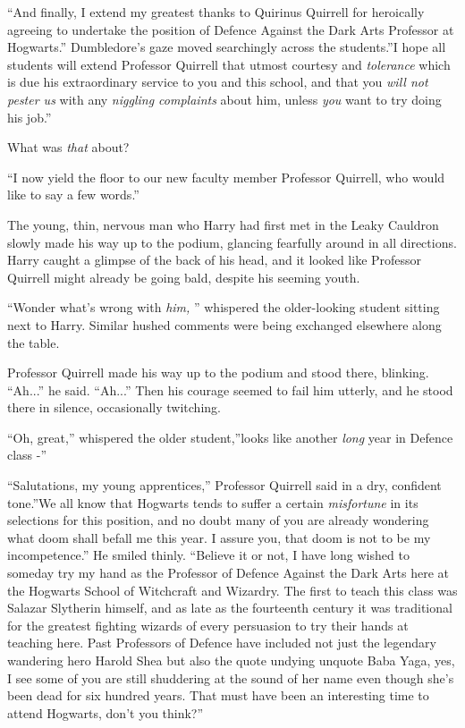 ``And finally, I extend my greatest thanks to Quirinus Quirrell for
heroically agreeing to undertake the position of Defence Against the
Dark Arts Professor at Hogwarts.'' Dumbledore's gaze moved searchingly
across the students.''I hope all students will extend Professor Quirrell
that utmost courtesy and \emph{tolerance} which is due his extraordinary
service to you and this school, and that you \emph{will not pester us}
with any \emph{niggling complaints} about him, unless \emph{you} want to
try doing his job.''

What was \emph{that} about?

``I now yield the floor to our new faculty member Professor Quirrell,
who would like to say a few words.''

The young, thin, nervous man who Harry had first met in the Leaky
Cauldron slowly made his way up to the podium, glancing fearfully around
in all directions. Harry caught a glimpse of the back of his head, and
it looked like Professor Quirrell might already be going bald, despite
his seeming youth.

``Wonder what's wrong with \emph{him,} '' whispered the older-looking
student sitting next to Harry. Similar hushed comments were being
exchanged elsewhere along the table.

Professor Quirrell made his way up to the podium and stood there,
blinking. ``Ah...'' he said. ``Ah...'' Then his courage seemed
to fail him utterly, and he stood there in silence, occasionally
twitching.

``Oh, great,'' whispered the older student,''looks like another
\emph{long} year in Defence class -''

``Salutations, my young apprentices,'' Professor Quirrell said in a dry,
confident tone.''We all know that Hogwarts tends to suffer a certain
\emph{misfortune} in its selections for this position, and no doubt many
of you are already wondering what doom shall befall me this year. I
assure you, that doom is not to be my incompetence.'' He smiled thinly.
``Believe it or not, I have long wished to someday try my hand as the
Professor of Defence Against the Dark Arts here at the Hogwarts School
of Witchcraft and Wizardry. The first to teach this class was Salazar
Slytherin himself, and as late as the fourteenth century it was
traditional for the greatest fighting wizards of every persuasion to try
their hands at teaching here. Past Professors of Defence have included
not just the legendary wandering hero Harold Shea but also the quote
undying unquote Baba Yaga, yes, I see some of you are still shuddering
at the sound of her name even though she's been dead for six hundred
years. That must have been an interesting time to attend Hogwarts, don't
you think?''

